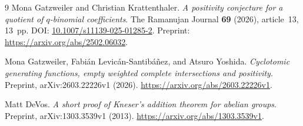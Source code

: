 \documentclass[11pt,a4paper]{article}
\numberwithin{equation}{section}
\theoremstyle{remark}
\begin{document}
\begin{thebibliography}{9}
Mona Gatzweiler and Christian Krattenthaler.
\emph{A positivity conjecture for a quotient of $q$-binomial coefficients}.
The Ramanujan Journal \textbf{69} (2026), article~13, 13~pp.
DOI: \href{https://doi.org/10.1007/s11139-025-01285-2}
{10.1007/s11139-025-01285-2}.
Preprint: \url{https://arxiv.org/abs/2502.06032}.

Mona Gatzweiler, Fabi\'an Levic\'an-Santib\'a\~nez, and Atsuro Yoshida.
\emph{Cyclotomic generating functions, empty weighted complete
intersections and positivity}.
Preprint, arXiv:2603.22226v1 (2026).
\url{https://arxiv.org/abs/2603.22226v1}.

Matt DeVos.
\emph{A short proof of Kneser's addition theorem for abelian groups}.
Preprint, arXiv:1303.3539v1 (2013).
\url{https://arxiv.org/abs/1303.3539v1}.
\end{thebibliography}
\end{document}
